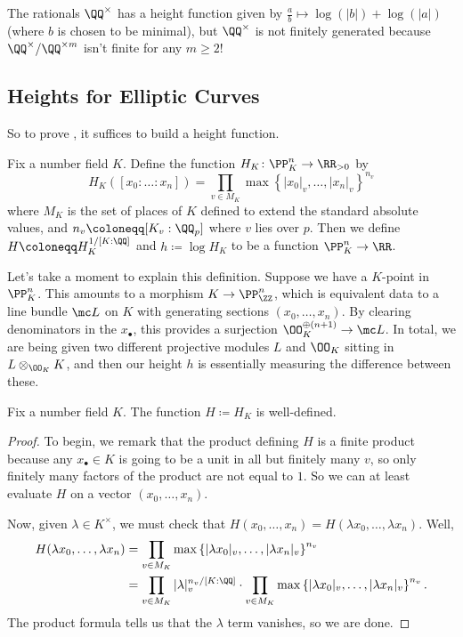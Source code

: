 \documentclass[../notes.tex]{subfiles}
\begin{document}
\begin{remark}
	The rationals $\QQ^\times$ has a height function given by $\frac ab\mapsto\log(|b|)+\log(|a|)$ (where $b$ is chosen to be minimal), but $\QQ^\times$ is not finitely generated because $\QQ^\times/\QQ^{\times m}$ isn't finite for any $m\ge2$!
\end{remark}

\subsection{Heights for Elliptic Curves}
So to prove , it suffices to build a height function.
\begin{definition}
	Fix a number field $K$. Define the function $H_K\colon\PP^n_K\to\RR_{>0}$ by
	\[H_K([x_0:\ldots:x_n])=\prod_{v\in M_K}\max\left\{|x_0|_v,\ldots,|x_n|_v\right\}^{n_v}\]
	where $M_K$ is the set of places of $K$ defined to extend the standard absolute values, and $n_v\coloneqq[K_v:\QQ_p]$ where $v$ lies over $p$. Then we define $H\coloneqq H_K^{1/[K:\QQ]}$ and $h\coloneqq\log H_K$ to be a function $\PP^n_K\to\RR$.
\end{definition}
\begin{remark}
	Let's take a moment to explain this definition. Suppose we have a $K$-point in $\PP^n_K$. This amounts to a morphism $K\to\PP^n_\ZZ$, which is equivalent data to a line bundle $\mc L$ on $K$ with generating sections $(x_0,\ldots,x_n)$. By clearing denominators in the $x_\bullet$, this provides a surjection $\OO_K^{\oplus(n+1)}\to\mc L$. In total, we are being given two different projective modules $L$ and $\OO_K$ sitting in $L\otimes_{\OO_K}K$, and then our height $h$ is essentially measuring the difference between these.
\end{remark}
\begin{lemma}
	Fix a number field $K$. The function $H\coloneqq H_K$ is well-defined.
\end{lemma}
\begin{proof}
	To begin, we remark that the product defining $H$ is a finite product because any $x_\bullet\in K$ is going to be a unit in all but finitely many $v$, so only finitely many factors of the product are not equal to $1$. So we can at least evaluate $H$ on a vector $(x_0,\ldots,x_n)$.
	
	Now, given $\lambda\in K^\times$, we must check that $H(x_0,\ldots,x_n)=H(\lambda x_0,\ldots,\lambda x_n)$. Well,
	\begin{align*}
		H(\lambda x_0,\ldots,\lambda x_n) &= \prod_{v\in M_K}\max\left\{|\lambda x_0|_v,\ldots,|\lambda x_n|_v\right\}^{n_v}\\
		&= \prod_{v\in M_K}|\lambda|_v^{n_v/[K:\QQ]}\cdot\prod_{v\in M_K}\max\left\{|\lambda x_0|_v,\ldots,|\lambda x_n|_v\right\}^{n_v}.
	\end{align*}
	The product formula tells us that the $\lambda$ term vanishes, so we are done.
\end{proof}
\end{document}
